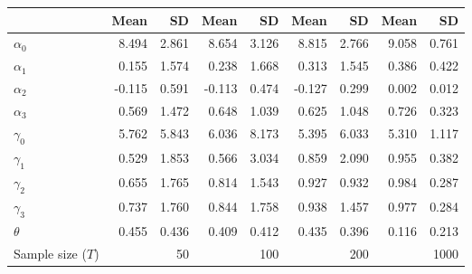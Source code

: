 
\begin{tabular}[t]{lrrrrrrrr}
\toprule
  & Mean & SD & Mean  & SD  & Mean   & SD   & Mean    & SD   \\
\midrule
$\alpha_{0}$ & 8.494 & 2.861 & 8.654 & 3.126 & 8.815 & 2.766 & 9.058 & 0.761\\
$\alpha_{1}$ & 0.155 & 1.574 & 0.238 & 1.668 & 0.313 & 1.545 & 0.386 & 0.422\\
$\alpha_{2}$ & -0.115 & 0.591 & -0.113 & 0.474 & -0.127 & 0.299 & 0.002 & 0.012\\
$\alpha_{3}$ & 0.569 & 1.472 & 0.648 & 1.039 & 0.625 & 1.048 & 0.726 & 0.323\\
$\gamma_{0}$ & 5.762 & 5.843 & 6.036 & 8.173 & 5.395 & 6.033 & 5.310 & 1.117\\
$\gamma_{1}$ & 0.529 & 1.853 & 0.566 & 3.034 & 0.859 & 2.090 & 0.955 & 0.382\\
$\gamma_{2}$ & 0.655 & 1.765 & 0.814 & 1.543 & 0.927 & 0.932 & 0.984 & 0.287\\
$\gamma_{3}$ & 0.737 & 1.760 & 0.844 & 1.758 & 0.938 & 1.457 & 0.977 & 0.284\\
$\theta$ & 0.455 & 0.436 & 0.409 & 0.412 & 0.435 & 0.396 & 0.116 & 0.213\\
Sample size ($T$) &  & 50 &  & 100 &  & 200 &  & 1000\\
\bottomrule
\end{tabular}
